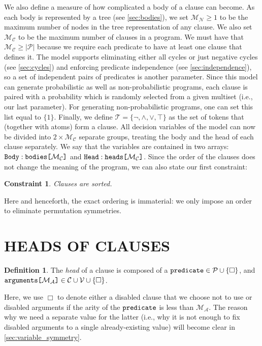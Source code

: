 \documentclass[letterpaper]{article}
\newtheorem{constraint}{Constraint}
\theoremstyle{definition}
\newtheorem{definition}{Definition}
\newcommand{\variable}[1]{\texttt{\textup{#1}}}
\newcommand{\arrayd}[3]{\variable{{#1}[}{#2}\variable{]} \in {#3}}
\newcommand{\arrayt}[3]{\variable{{#3}} : \variable{{#1}[}{#2}\variable{]}}
\newcommand{\predicates}{\mathcal{P}}
\newcommand{\variables}{\mathcal{V}}
\newcommand{\constants}{\mathcal{C}}
\newcommand{\tokens}{\mathcal{T}}
\newcommand{\maxArity}{\mathcal{M}_{\mathcal{A}}}
\newcommand{\maxNumNodes}{\mathcal{M}_{\mathcal{N}}}
\newcommand{\maxNumClauses}{\mathcal{M}_{\mathcal{C}}}
\begin{document}
We also define a measure of how complicated a body of a clause can become. As
each body is represented by a tree (see \cref{sec:bodies}), we set
$\maxNumNodes{} \ge 1$ to be the maximum number of nodes in the tree
representation of any clause. We also set $\maxNumClauses{}$ to be the maximum
number of clauses in a program. We must have that $\maxNumClauses{} \ge
|\predicates{}|$ because we require each predicate to have at least one clause
that defines it. The model supports eliminating either all cycles or just
negative cycles (see \cref{sec:cycles}) and enforcing predicate independence
(see \cref{sec:independence}), so a set of independent pairs of predicates is
another parameter. Since this model can generate probabilistic as well as
non-probabilistic programs, each clause is paired with a probability which is
randomly selected from a given multiset (i.e., our last parameter). For
generating non-probabilistic programs, one can set this list equal to $\{ 1 \}$.
Finally, we define $\tokens{} = \{ \neg, \land, \lor, \top \}$ as the set of
tokens that (together with atoms) form a clause. All decision variables of the
model can now be divided into $2 \times \maxNumClauses{}$ separate groups,
treating the body and the head of each clause separately. We say that the
variables are contained in two arrays: $\arrayt{bodies}{\maxNumClauses{}}{Body}$
and $\arrayt{heads}{\maxNumClauses{}}{Head}$. Since the order of the clauses
does not change the meaning of the program, we can also state our first
constraint:

\begin{constraint}
  Clauses are sorted.
\end{constraint}

Here and henceforth, the exact ordering is immaterial: we only impose an order
to eliminate permutation symmetries.

\section{HEADS OF CLAUSES} \label{sec:heads}

\begin{definition}
  The \emph{head} of a clause is composed of a $\variable{predicate} \in
  \predicates \cup \{ \Box \}$, and
  $\arrayd{arguments}{\maxArity{}}{\constants{} \cup \variables{}} \cup \{ \Box
  \}$.
\end{definition}

Here, we use $\Box$ to denote either a disabled clause that we choose not to use
or disabled arguments if the arity of the $\variable{predicate}$ is less than
$\maxArity{}$. The reason why we need a separate value for the latter (i.e., why
it is not enough to fix disabled arguments to a single already-existing value)
will become clear in \cref{sec:variable_symmetry}.
\end{document}
